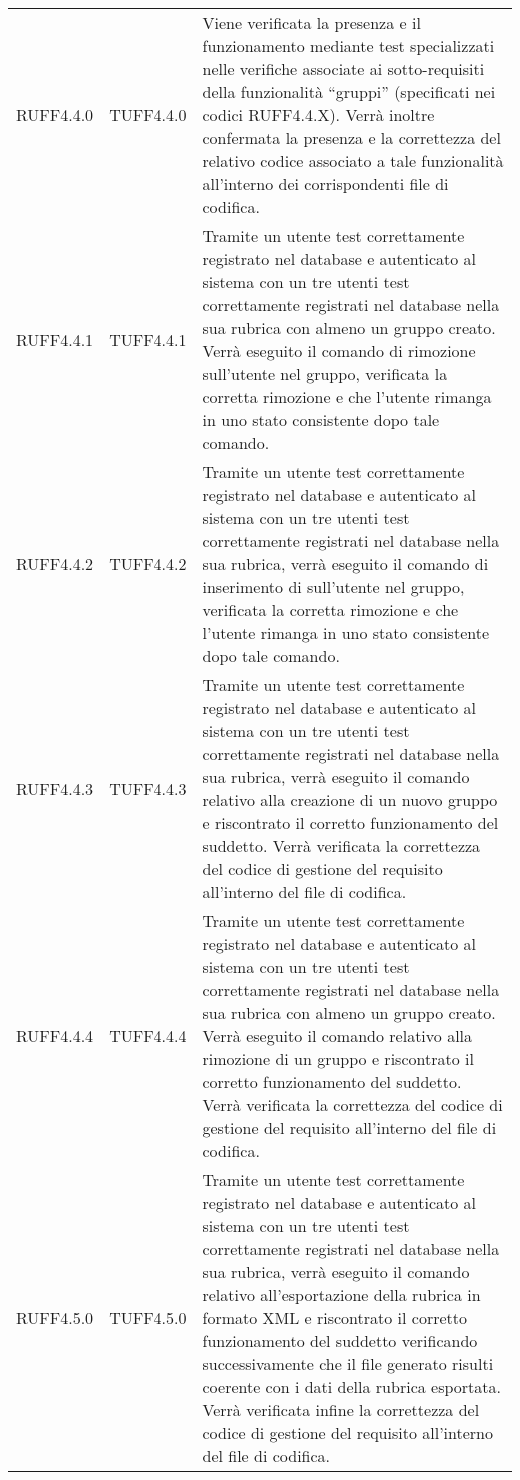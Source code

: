 \begin{center}
\begin{longtable}{llp{}}
RUFF4.4.0 & TUFF4.4.0& Viene verificata la presenza e il funzionamento mediante test specializzati nelle verifiche associate ai sotto-requisiti della funzionalità ``gruppi'' (specificati nei codici RUFF4.4.X). Verrà inoltre confermata la presenza e la correttezza del relativo codice associato a tale funzionalità all'interno dei corrispondenti file di codifica.\\
RUFF4.4.1 & TUFF4.4.1& Tramite un utente test correttamente registrato nel database e autenticato al sistema con un tre utenti test correttamente registrati nel database nella sua rubrica con almeno un gruppo creato. Verrà eseguito il comando di rimozione sull'utente nel gruppo, verificata la corretta rimozione e che l'utente rimanga in uno stato consistente dopo tale comando.\\
RUFF4.4.2 & TUFF4.4.2& Tramite un utente test correttamente registrato nel database e autenticato al sistema con un tre utenti test correttamente registrati nel database nella sua rubrica, verrà eseguito il comando di inserimento di sull'utente nel gruppo, verificata la corretta rimozione e che l'utente rimanga in uno stato consistente dopo tale comando.\\
RUFF4.4.3 & TUFF4.4.3& Tramite un utente test correttamente registrato nel database e autenticato al sistema con un tre utenti test correttamente registrati nel database nella sua rubrica, verrà eseguito il comando relativo alla creazione di un nuovo gruppo e riscontrato il corretto funzionamento del suddetto. Verrà verificata la correttezza del codice di gestione del requisito all'interno del file di codifica.\\
RUFF4.4.4 & TUFF4.4.4& Tramite un utente test correttamente registrato nel database e autenticato al sistema con un tre utenti test correttamente registrati nel database nella sua rubrica con almeno un gruppo creato. Verrà eseguito il comando relativo alla rimozione di un gruppo e riscontrato il corretto funzionamento del suddetto. Verrà verificata la correttezza del codice di gestione del requisito all'interno del file di codifica.\\
RUFF4.5.0 & TUFF4.5.0& Tramite un utente test correttamente registrato nel database e autenticato al sistema con un tre utenti test correttamente registrati nel database nella sua rubrica, verrà eseguito il comando relativo all'esportazione della rubrica in formato XML e riscontrato il corretto funzionamento del suddetto verificando successivamente che il file generato risulti coerente con i dati della rubrica esportata. Verrà verificata infine la correttezza del codice di gestione del requisito all'interno del file di codifica.\\

\end{longtable}
\end{center}
